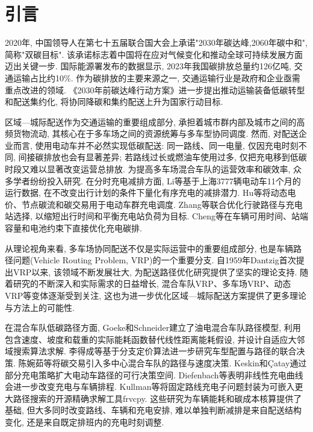 \documentclass{setp-new}
\begin{document}
\maketitle
\clearpage


\section{引言}

2020年, 中国领导人在第七十五届联合国大会上承诺"2030年碳达峰,2060年碳中和", 简称"双碳目标".
该承诺标志着中国将在应对气候变化和推动全球可持续发展方面迈出关键一步.
国际能源署发布的数据显示, 2023年我国碳排放总量约126亿吨, 交通运输占比约10\%.
作为碳排放的主要来源之一, 交通运输行业是政府和企业亟需重点改进的领域.
《2030年前碳达峰行动方案》进一步提出推动运输装备低碳转型和配送集约化\cite{ref:55},
将协同降碳和集约配送上升为国家行动目标.

区域—城际配送作为交通运输的重要组成部分,
承担着城市群内部及城市之间的高频货物流动, 其核心在于多车场之间的资源统筹与多车型协同调度.
然而, 对配送企业而言, 使用电动车并不必然实现低碳配送:
同一路线、同一电量, 仅因充电时刻不同, 间接碳排放也会有显著差异;
若路线过长或燃油车使用过多, 仅把充电移到低碳时段又难以显著改变运营总排放.
为提高多车场混合车队的运营效率和碳效率, 众多学者纷纷投入研究.
在分时充电减排方面, Li等\cite{ref:52}基于上海3777辆电动车11个月的运行数据,
在不改变出行计划的条件下量化有序充电的减排潜力.
Hu等\cite{ref:53}将动态电价、节点碳流和碳交易用于电动车群充电调度.
Zhang等\cite{ref:54}联合优化行驶路径与充电站选择, 以缩短出行时间和平衡充电站负荷为目标.
Cheng等\cite{ref:50}在车辆可用时间、站端容量和电池约束下直接优化充电碳排.

从理论视角来看, 多车场协同配送不仅是实际运营中的重要组成部分,
也是车辆路径问题(Vehicle Routing Problem, VRP)的一个重要分支.
自1959年Dantzig首次提出VRP以来, 该领域不断发展壮大,
为配送路径优化研究提供了坚实的理论支持.
随着研究的不断深入和实际需求的日益增长,
混合车队VRP、多车场VRP、动态VRP等变体逐渐受到关注,
这也为进一步优化区域—城际配送方案提供了更多理论与方法上的可能性.

在混合车队低碳路径方面, Goeke和Schneider\cite{ref:27}建立了油电混合车队路径模型,
利用包含速度、坡度和载重的实际能耗函数替代线性距离能耗假设,
并设计自适应大邻域搜索算法求解.
李得成等\cite{ref:6}基于分支定价算法进一步研究车型配置与路径的联合决策.
陈婉茹等\cite{ref:23}将碳交易引入多中心混合车队的路径与速度决策.
Keskin和\c{C}atay\cite{ref:45}通过部分充电策略扩大电动车路径的可行决策空间.
Diefenbach等\cite{ref:46}表明非线性充电曲线会进一步改变充电与车辆排程.
Kullman等\cite{ref:73}将固定路线充电子问题封装为可嵌入更大路径搜索的开源精确求解工具frvcpy.
这些研究为车辆能耗和碳成本核算提供了基础,
但大多同时改变路线、车辆和充电安排,
难以单独判断减排是来自配送结构变化, 还是来自既定排班内的充电时刻调整.
\end{document}
